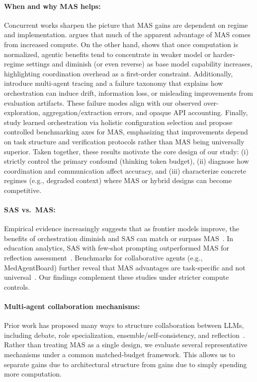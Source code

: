 \documentclass{article} %
\begin{document}
\paragraph{When and why MAS helps:}
Concurrent works sharpen the picture that MAS gains are dependent on regime and implementation. \citet{anthropic2025researchsystem} argues that much of the apparent advantage of MAS comes from increased compute. On the other hand, \citet{kim2025towards} shows that once computation is normalized, agentic benefits tend to concentrate in weaker model or harder-regime settings and diminish (or even reverse) as base model capability increases, highlighting coordination overhead as a first-order constraint. Additionally, \citet{cemri2025multi} introduce multi-agent tracing and a failure taxonomy that explains how orchestration can induce drift, information loss, or misleading improvements from evaluation artifacts. These failure modes  align with our observed over-exploration, aggregation/extraction errors, and opaque API accounting. Finally, \citet{ke2026mas} study learned orchestration via holistic configuration selection and propose controlled benchmarking axes for MAS, emphasizing that improvements depend on task structure and verification protocols rather than MAS being universally superior. Taken together, these results motivate the core design of our study: (i) strictly control the primary confound (thinking token budget), (ii) diagnose how coordination and communication affect accuracy, and (iii) characterize concrete regimes (e.g., degraded context) where MAS or hybrid designs can become competitive.

\paragraph{SAS vs.\ MAS:}
Empirical evidence increasingly suggests that as frontier models improve, the benefits of orchestration diminish and SAS can match or surpass MAS~\citep{gao2025whynotboth}. In education analytics, SAS with few-shot prompting outperformed MAS for reflection assessment~\citep{li2025single}. Benchmarks for collaborative agents (e.g., MedAgentBoard) further reveal that MAS advantages are task-specific and not universal~\citep{zhu2025medagentboard}. Our findings complement these studies under stricter compute controls.

\paragraph{Multi-agent collaboration mechanisms: }
Prior work has proposed many ways to structure collaboration between LLMs, including debate, role specialization, ensemble/self-consistency, and reflection~\citep{du2024improving,zhang2023exploring,li2024more,shinn2023reflexion}. Rather than treating MAS as a single design, we evaluate several representative mechanisms under a common matched-budget framework. This allows us to separate gains due to architectural structure from gains due to simply spending more computation.
\end{document}
